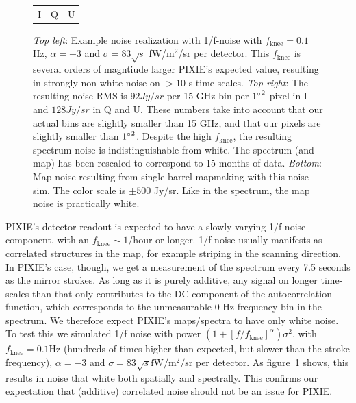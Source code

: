 \documentclass{article}
\begin{document}
\begin{figure}
\begin{tabular}{m{56mm}m{54.4mm}m{56mm}}
		\hspace{32mm}I & \hspace{32mm}Q & \hspace{32mm}U
	\end{tabular}
	\caption{\emph{Top left}: Example noise realization with 1/f-noise with
		$f_\textrm{knee} = 0.1$ Hz, $\alpha=-3$ and $\sigma = 83 \sqrt{s}$
		fW/$\textrm{m}^2$/sr per detector. This $f_\textrm{knee}$ is
		several orders of magntiude larger PIXIE's expected value,
		resulting in strongly non-white noise on $>10$ s time scales.
		\emph{Top right}: The resulting noise RMS is $92 Jy/sr$ per 15 GHz
		bin per ${1\degree}^2$ pixel in I and $128 Jy/sr$ in Q and U. These
		numbers take into account that our actual bins are slightly smaller than
		15 GHz, and that our pixels are slightly smaller than ${1\degree}^2$.
		Despite the high $f_\textrm{knee}$, the resulting spectrum noise is
		indistinguishable from white. The spectrum (and map) has been
		rescaled to correspond to 15 months of data. \emph{Bottom}: Map
		noise resulting from single-barrel mapmaking with this noise sim.
		The color scale is $\pm 500$ Jy/sr. Like in the spectrum, the map noise
		is practically white.}
		\label{fig:corrnoise}
\end{figure}
PIXIE's detector readout is expected to have a slowly varying 1/f noise component,
with an $f_\textrm{knee} \sim 1/\textrm{hour}$ or longer. 1/f noise usually manifests as
correlated structures in the map, for example striping in the scanning direction.
In PIXIE's case, though, we get a measurement of the spectrum every 7.5 seconds
as the mirror strokes. As long as it is purely additive, any signal on longer time-scales than that only contributes
to the DC component of the autocorrelation function, which corresponds to the
unmeasurable 0 Hz frequency bin in the spectrum. We therefore expect PIXIE's
maps/spectra to have only white noise. To test this we simulated 1/f noise with
power $(1+[f/f_\textrm{knee}]^\alpha)\sigma^2$, with $f_\textrm{knee} = 0.1 \textrm{Hz}$
(hundreds of times higher than expected, but slower than the stroke frequency),
$\alpha=-3$ and $\sigma = 83\sqrt{s} \textrm{fW}/\textrm{m}^2/\textrm{sr}$ per detector.
As figure~\ref{fig:corrnoise} shows, this results in noise that white both
spatially and spectrally. This confirms our expectation that (additive) correlated
noise should not be an issue for PIXIE.
\end{document}
